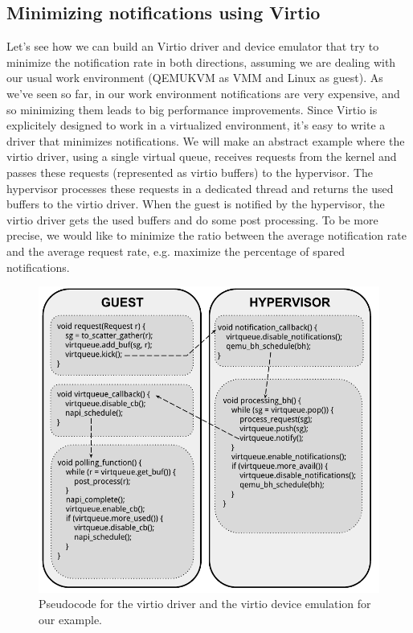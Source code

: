

\subsection{Minimizing notifications using Virtio}
\label{sec:virtiomin}
Let's see how we can build an Virtio driver and device emulator that try to minimize the notification rate in both directions, assuming we
are dealing with our usual work environment (QEMUKVM as VMM and Linux as guest).
As we've seen so far, in our work environment notifications are very expensive, and so minimizing them leads to big performance
improvements. Since Virtio is explicitely designed to work in a virtualized environment, it's easy to write a driver that minimizes
notifications.
We will make an abstract example where the virtio driver, using a single virtual queue, receives requests from the kernel and passes
these requests (represented as virtio buffers) to the hypervisor. The hypervisor processes these requests in a dedicated thread and returns 
the used buffers to the virtio driver. When the guest is notified by the hypervisor, the virtio driver gets the used buffers and do some
post processing. To be more precise, we would like to minimize the ratio between the average notification rate and the average request rate,
e.g. maximize the percentage of spared notifications.

\vspace{0.5cm}

\begin{figure}[bt]
\centering
\includegraphics[scale = 1.0]{virtiocode.pdf}
\caption{Pseudocode for the virtio driver and the virtio device emulation for our example.}
\label{fig:virtiocode}
\end{figure}

